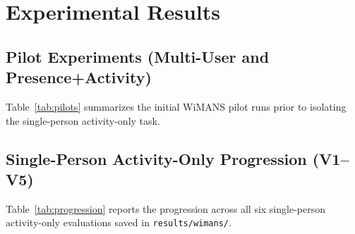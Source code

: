 \documentclass[11pt,a4paper]{article}
\begin{document}
\section{Experimental Results}

\subsection{Pilot Experiments (Multi-User and Presence+Activity)}
Table~\ref{tab:pilots} summarizes the initial WiMANS pilot runs prior to isolating the single-person activity-only task.

\begin{table}[H]
\centering
\caption{Summary of WiMANS Multi-User and Single-Person Presence+Activity Pilots (\texttt{gemini-3.5-flash-lite})}
\label{tab:pilots}
\end{table}

\subsection{Single-Person Activity-Only Progression (V1--V5)}
Table~\ref{tab:progression} reports the progression across all six single-person activity-only evaluations saved in \texttt{results/wimans/}.
\end{document}
